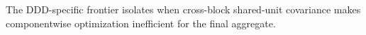 The DDD-specific frontier isolates when cross-block shared-unit covariance makes componentwise optimization inefficient for the final aggregate.
